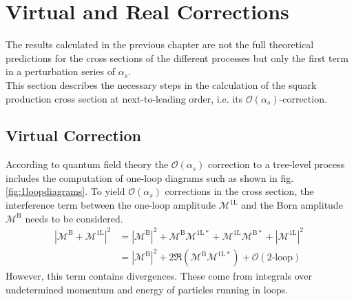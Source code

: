 \section{Virtual and Real Corrections}\label{sec:VirtRealCorr}
The results calculated in the previous chapter are not the full theoretical predictions for the cross sections of the different processes but only the first term in a perturbation series of $\alpha_s$.\\
This section describes the necessary steps in the calculation of the squark production cross section at next-to-leading order, i.e. its $\mathcal{O}(\alpha_s)$-correction.\\


\subsection{Virtual Correction}
According to quantum field theory the $\mathcal{O}(\alpha_s)$ correction to a tree-level process includes the computation of one-loop diagrams such as shown in fig. \ref{fig:1loopdiagrams}. To yield $\mathcal{O}(\alpha_s)$ corrections in the cross section, the interference term between the one-loop amplitude $\mathcal{M}^{\mathrm{1L}}$ and the Born amplitude $\mathcal{M}^{\mathrm{B}}$ needs to be considered. 
\begin{align}
\left| \mathcal{M}^{\mathrm{B}} + \mathcal{M}^{\mathrm{1L}} \right|^2 &= \left| \mathcal{M}^{\mathrm{B}} \right|^2 + \mathcal{M}^{\mathrm{B}} \mathcal{M}^{\mathrm{1L}\ast} + \mathcal{M}^{\mathrm{1L}} \mathcal{M}^{\mathrm{B}\ast} + \left| \mathcal{M}^{\mathrm{1L}} \right|^2\nonumber\\
&= \left| \mathcal{M}^{\mathrm{B}} \right|^2 + 2 \Re \left( \mathcal{M}^{\mathrm{B}} \mathcal{M}^{\mathrm{1L}\ast} \right) + \mathcal{O}(\mbox{2-loop})
\end{align}
However, this term contains divergences. These come from integrals over undetermined momentum and energy of particles running in loops.
